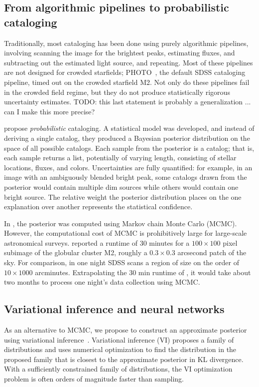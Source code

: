 \subsection{From algorithmic pipelines to probabilistic cataloging}

Traditionally, most cataloging has been done using purely algorithmic pipelines, involving scanning the image for the brightest peaks, estimating fluxes, and subtracting out the estimated light source, and repeating. Most of these pipelines are not designed for crowded starfields; PHOTO~\cite{lupton2001sdss}, 
the default SDSS cataloging pipeline, timed out on 
the crowded starfield M2. 
Not only do these pipelines fail in the crowded field 
regime, but they do not produce statistically rigorous uncertainty estimates. TODO: this last statement is probably a generalization ... can I make this more precise?

\cite{Brewer_2013, Portillo_2017, Feder_2019}
propose {\itshape probabilistic} cataloging. A statistical model was developed, and instead of deriving a single catalog, they produced a Bayesian posterior distribution on the space of all possible catalogs. 
Each sample from the posterior is a catalog; that is, each sample returns a list, potentially of varying length, consisting of stellar locations, fluxes, and colors. Uncertainties are fully quantified: for example, in an image with an ambiguously blended bright peak, some catalogs drawn from the posterior would contain multiple dim sources while others would contain one bright source. The relative weight the posterior distribution places on the one explanation over another represents the statistical confidence. 

In \cite{Brewer_2013, Portillo_2017, Feder_2019},
the posterior was computed using
Markov chain Monte Carlo (MCMC). 
However, the computational cost of MCMC is prohibitively large for
large-scale astronomical surveys. \cite{Feder_2019} reported a runtime of 30 minutes for a $100\times 100$ pixel subimage of the globular cluster M2, roughly a $0.3\times0.3$ arcsecond patch of the sky.
For comparison, in one night SDSS scans a region of size on the order of $10 \times 1000$ arcminutes. Extrapolating the 30 min runtime of \cite{Feder_2019}, 
it would take about two months to process one night's data collection using MCMC. 

\subsection{Variational inference and neural networks}
As an alternative to MCMC, we propose to construct an approximate posterior using variational inference~\cite{Blei_2017_vi_review,Jordan_intro_vi, Wainwrite_graph_models_vi}.
Variational inference (VI) proposes a family of distributions and uses numerical optimization to find the distribution 
in the proposed family that is closest 
to the approximate posterior in KL divergence. 
With a sufficiently constrained family of distributions, the VI optimization problem is often orders of magnitude faster than sampling. 

